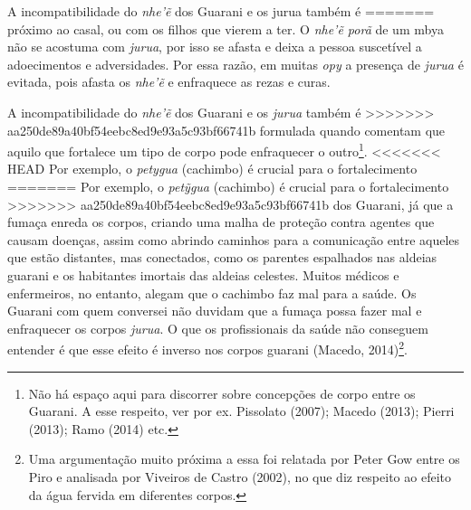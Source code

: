 {A incompatibilidade do \emph{nhe’ẽ} dos Guarani e os jurua também é
=======
próximo ao casal, ou com os filhos que vierem a ter. O \emph{nhe’\~{e} porã}
de um mbya não se acostuma com \emph{jurua}, por isso se afasta e deixa a
pessoa suscetível a adoecimentos e adversidades. Por essa razão, em
muitas \emph{opy} a presença de \emph{jurua} é evitada, pois afasta os \emph{nhe’\~{e}} e
enfraquece as rezas e curas.

A incompatibilidade do \emph{nhe’\~{e}} dos Guarani e os \emph{jurua} também é
>>>>>>> aa250de89a40bf54eebc8ed9e93a5c93bf66741b
formulada quando comentam que aquilo que fortalece um tipo de corpo
pode enfraquecer o outro\footnote{Não há espaço aqui para discorrer
sobre concepções de corpo entre os Guarani. A esse respeito, ver por
ex. Pissolato (2007); Macedo (2013); Pierri (2013); Ramo (2014) etc.}.
<<<<<<< HEAD
Por exemplo, o \emph{petygua} (cachimbo) é crucial para o fortalecimento
=======
Por exemplo, o \emph{pet\~{y}gua} (cachimbo) é crucial para o fortalecimento
>>>>>>> aa250de89a40bf54eebc8ed9e93a5c93bf66741b
dos Guarani, já que a fumaça enreda os corpos, criando uma malha de
proteção contra agentes que causam doenças, assim como abrindo caminhos
para a comunicação entre aqueles que estão distantes, mas conectados,
como os parentes espalhados nas aldeias guarani e os habitantes
imortais das aldeias celestes. Muitos médicos e enfermeiros, no
entanto, alegam que o cachimbo faz mal para a saúde. Os Guarani com
quem conversei não duvidam que a fumaça possa fazer mal e enfraquecer
os corpos \emph{jurua}. O que os profissionais da saúde não conseguem entender
é que esse efeito é inverso nos corpos guarani (Macedo,
2014)\footnote{Uma argumentação muito próxima a essa foi relatada por
Peter Gow entre os Piro e analisada por Viveiros de Castro (2002), no
que diz respeito ao efeito da água fervida em diferentes corpos.}. 

}
